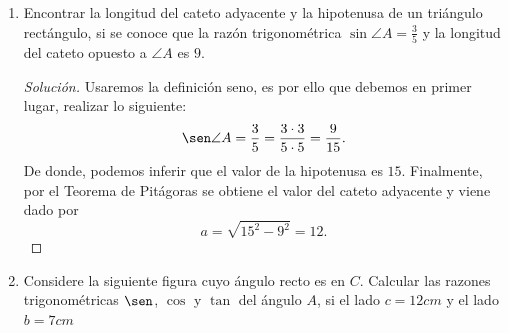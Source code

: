 \documentclass[12pt]{article}
\begin{document}
\begin{enumerate}[leftmargin=*]
\begin{proof}[Soluci\'on]
\begin{center}
\end{center}
Ahora bien, se ha obtenido un $\triangle $ rect\'angulo $GMH$. La idea es utilizar las hip\'otesis que tenemos, es as\'i que 
\[
\cos \angle G = 0.8 = \frac{GH}{GM}
\]
Por tanto, hemos obtenido que 
\[
0,8 \cdot GM = GH.
\]
Usando el hecho de que $GM=12$, se sigue que $GH=9.6$.
Finalmente, hallamos la altura usando el teorema de Pitágoras:
\[
GM^2 = GH^2 + MH^2
\]
Por tanto, 
\[
MH= \sqrt{ 12^2 - 9.6^2}=7.2
\]
\end{proof}
\item Encontrar la longitud del cateto adyacente y la hipotenusa de un triángulo rectángulo, si se conoce que la razón trigonométrica $\sin \angle A = \frac{3}{5}$ y la longitud del cateto opuesto a $\angle A$ es $9$.
\begin{proof}[Soluci\'on]
    Usaremos
la definición seno, es por ello que debemos en primer lugar, realizar lo siguiente:
\[
\sen \angle A = \frac{3}{5} = \frac{3 \cdot  3}{5 \cdot 5} = \frac{9}{15}.
\]
De donde, podemos inferir que el valor de la hipotenusa es $15$. Finalmente, por el Teorema de Pit\'agoras se obtiene el valor del cateto adyacente y viene dado por 
\[
a = \sqrt{15^2 - 9^2} = 12. 
\]
\end{proof}
\item Considere la siguiente figura cuyo \'angulo recto es en $C$. Calcular las razones trigonom\'etricas $\sen$, $\cos$ y $\tan$ del \'angulo $A$, si el lado $c=12cm$ y el lado $b=7cm$
\begin{center}
    \begin{tikzpicture}
    

\end{tikzpicture}
\end{center}
\end{enumerate}
\end{document}

